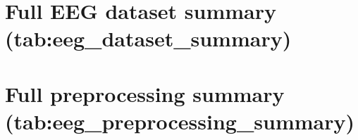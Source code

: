 \section{Full EEG dataset summary (tab:eeg\_\allowbreak dataset\_\allowbreak summary)}
\label{sec:appendix_ch4_tab_eeg_dataset_summary}

%


\section{Full preprocessing summary (tab:eeg\_\allowbreak preprocessing\_\allowbreak summary)}
\label{sec:appendix_ch4_tab_eeg_preprocessing_summary}


